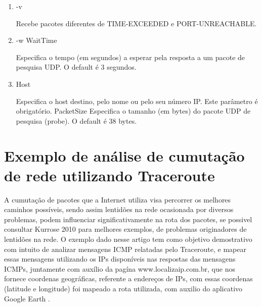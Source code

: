 \documentclass[
	article,			%
	11pt,				%
	oneside,			%
	a4paper,			%
	section=TITLE,		%
	english,			%
	brazil,				%
	sumario=tradicional
	]{abntex2}
\begin{document}
\begin{enumerate}
	\item -v
	
	Recebe pacotes diferentes de TIME-EXCEEDED e PORT-UNREACHABLE.
	
	\item -w WaitTime 
	
	Especifica o tempo (em segundos) a esperar pela resposta a um pacote de pesquisa UDP. O default é 3 segundos.
	
	
	\item Host      
	
	Especifica o host destino, pelo nome ou pelo seu número IP. Este parâmetro é obrigatório. PacketSize Especifica o tamanho (em bytes)  do pacote UDP de pesquisa (probe). O default é 38 bytes.     
\end{enumerate}                    


\section{Exemplo de análise de cumutação de rede utilizando Traceroute}
A cumutação de pacotes que a Internet utiliza visa percorrer os melhores caminhos possíveis, sendo assim lentid\~oes na rede ocasionada por diversos problemas, podem influenciar significativamente na rota dos pacotes, se possivel consultar Kurrose 2010 para melhores exemplos, de problemas originadores de lentid\~oes na rede. 
O exemplo dado nesse artigo tem como objetivo demostrativo com intuito de analizar mensagens ICMP relatadas pelo Traceroute, e mapear essas mensagens utilizando os IPs disponíveis nas respostas das mensagens ICMPs, juntamente com auxílio da pagína www.localizaip.com.br, que nos fornece coordenas geográficas, referente a endereços de IPs, com essas coordenas (latitude e longitude) foi mapeado a rota utilizada, com auxilio do aplicativo Google Earth . 
\end{document}
